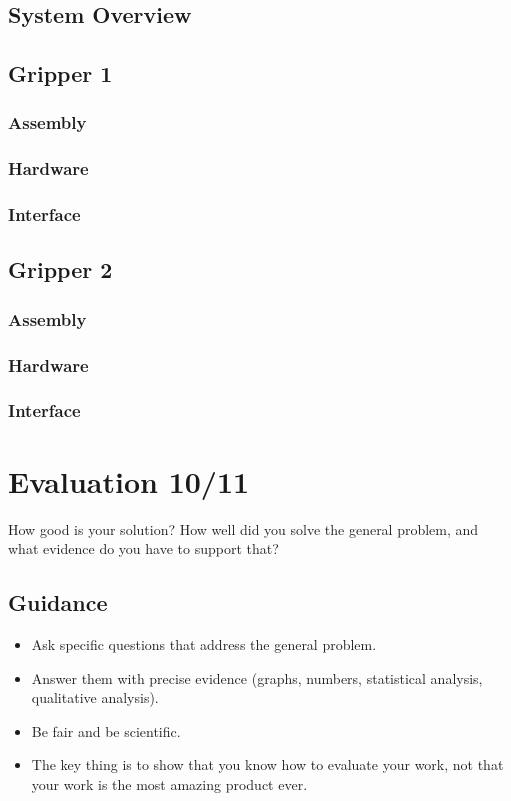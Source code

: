 \documentclass{l4proj}
\begin{document}
\section{System Overview}

\section{Gripper 1}
\subsection{Assembly}
\subsection{Hardware}
\subsection{Interface}

\section{Gripper 2}
\subsection{Assembly}
\subsection{Hardware}
\subsection{Interface}


\chapter{Evaluation 10/11} 
How good is your solution? How well did you solve the general problem, and what evidence do you have to support that?

\section{Guidance}
\begin{itemize}
  \item
    Ask specific questions that address the general problem.
  \item
    Answer them with precise evidence (graphs, numbers, statistical
    analysis, qualitative analysis).
  \item
    Be fair and be scientific.
  \item
    The key thing is to show that you know how to evaluate your work, not
    that your work is the most amazing product ever.
\end{itemize}
\end{document}
